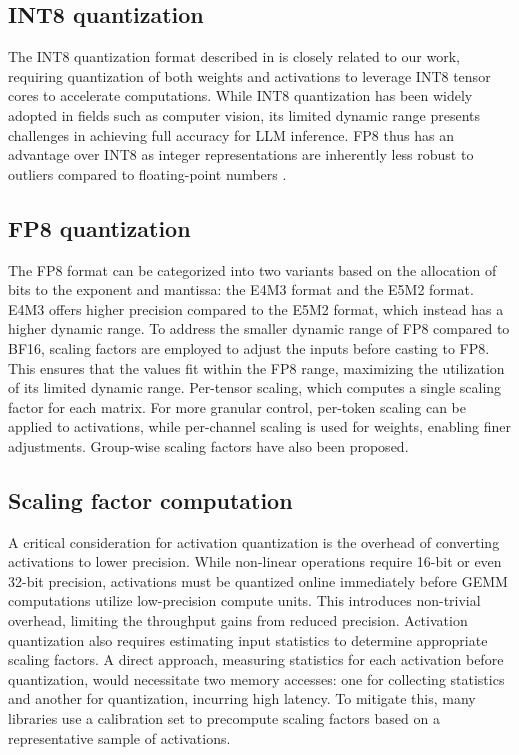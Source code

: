 \subsection{INT8 quantization}

The INT8 quantization format described in \citet{xiao2024smoothquantaccurateefficientposttraining} is closely related to our work, requiring quantization of both weights and activations to leverage INT8 tensor cores to accelerate computations. 
While INT8 quantization has been widely adopted in fields such as computer vision, its limited dynamic range presents challenges in achieving full accuracy for LLM inference.
FP8 thus has an advantage over INT8 as integer representations are inherently less robust to outliers compared to floating-point numbers \citep{MLSYS2024_dea9b4b6, kurtic2024givebf16deathaccuracyperformance}.

\subsection{FP8 quantization}

The FP8 format can be categorized into two variants based on the allocation of bits to the exponent and mantissa: the E4M3 format and the E5M2 format. E4M3 offers higher precision compared to the E5M2 format, which instead has a higher dynamic range.
To address the smaller dynamic range of FP8 compared to BF16, scaling factors are employed to adjust the inputs before casting to FP8. This ensures that the values fit within the FP8 range, maximizing the utilization of its limited dynamic range.
Per-tensor scaling, which computes a single scaling factor for each matrix. For more granular control, per-token scaling can be applied to activations, while per-channel scaling is used for weights, enabling finer adjustments. Group-wise scaling factors \citep{deepseekai2024deepseekv3technicalreport} have also been proposed.


\subsection{Scaling factor computation}

A critical consideration for activation quantization is the overhead of converting activations to lower precision. While non-linear operations require 16-bit or even 32-bit precision, activations must be quantized online immediately before GEMM computations utilize low-precision compute units. This introduces non-trivial overhead, limiting the throughput gains from reduced precision. Activation quantization also requires estimating input statistics to determine appropriate scaling factors. A direct approach, measuring statistics for each activation before quantization, would necessitate two memory accesses: one for collecting statistics and another for quantization, incurring high latency. To mitigate this, many libraries use a calibration set to precompute scaling factors based on a representative sample of activations.

